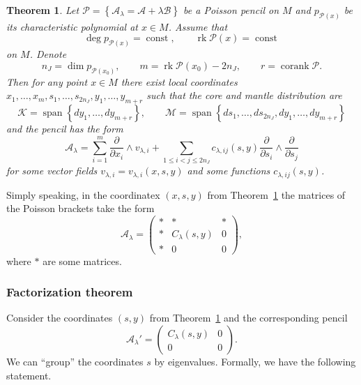 \documentclass[12pt]{article}
\newtheorem{theorem}[lemma]{Theorem}
\theoremstyle{definition}
\begin{document}
\begin{theorem}  \label{T:BiPoissRedCoreMantle}  Let $\mathcal{P} = \left\{ \mathcal{A}_{\lambda} = \mathcal{A} + \lambda \mathcal{B}\right\}$ be a Poisson pencil on $M$ and $p_{\mathcal{P}(x)}$ be its characteristic polynomial at $x\in M$. Assume that \[\deg p_{\mathcal{P}(x)} = \operatorname{const}, \qquad \operatorname{rk} \mathcal{P}(x) = \operatorname{const}\] on $M$.  Denote \[ n_J = \dim p_{\mathcal{P}(x_0)}, \qquad m  = \operatorname{rk} \mathcal{P}(x_0) - 2n_J, \qquad r = \operatorname{corank} \mathcal{P}.\]  
Then for any point $x \in M$ there exist local coordinates $x_1,\dots, x_{m}, s_1, \dots, s_{2n_J}, y_1, \dots, y_{m+r}$ such that the core and mantle distribution are \begin{equation} \label{Eq:CoreMantleDistLoc} \mathcal{K} = \operatorname{span}\left\{dy_1, \dots, dy_{m+r} \right\}, \qquad \mathcal{M} = \operatorname{span}\left\{ds_1, \dots, ds_{2n_J}, dy_1, \dots, dy_{m+r} \right\}\end{equation} and the pencil has the form \[\mathcal{A}_{\lambda} = \sum_{i=1}^{m} \frac{\partial}{\partial x_i} \wedge v_{\lambda, i} + \sum_{1 \leq i < j \leq 2 n_J} c_{\lambda, ij}(s, y)  \frac{\partial}{\partial s_i} \wedge \frac{\partial}{\partial s_j} \] for some vector fields $v_{\lambda, i} = v_{\lambda, i}(x, s, y)$ and some functions $c_{\lambda, ij}(s, y)$.  \end{theorem}


Simply speaking, in the coordinatex $(x, s, y)$ from Theorem~\ref{T:BiPoissRedCoreMantle}  the matrices of the Poisson brackets take the form \begin{equation} \label{Eq:CoreMantleMatr} \mathcal{A}_{\lambda} = \left( \begin{matrix} * & * & * \\ * & C_{\lambda}(s, y) & 0 \\ * & 0 & 0\end{matrix} \right), \end{equation}  where $*$ are some matrices. 

\subsubsection{Factorization theorem}

Consider the coordinates $(s,y)$ from Theorem~\ref{T:BiPoissRedCoreMantle} and the corresponding pencil \[\mathcal{A}_{\lambda}' =  \left( \begin{matrix}   C_{\lambda}(s, y) & 0 \\  0 & 0\end{matrix} \right).\] We can ``group'' the coordinates $s$ by eigenvalues. Formally, we have the following statement. 
\end{document}
